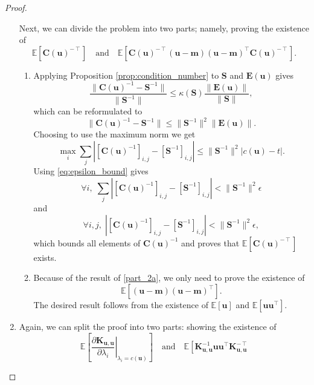 \documentclass{article}
\theoremstyle{definition}
\newcommand{\Kuu}{\mathbf{K}_{\mathbf{u},\mathbf{u}}}
\begin{document}
\begin{proof}
\begin{enumerate}
    Next, we can divide the problem into two parts; namely, proving the
    existence of
    \[ \mathbb{E}[\mathbf{C}(\mathbf{u})^{-\intercal}] \quad \text{and} \quad
      \mathbb{E}[\mathbf{C}(\mathbf{u})^{-\intercal}(\mathbf{u} -
      \mathbf{m})(\mathbf{u} -
      \mathbf{m})^\intercal\mathbf{C}(\mathbf{u})^{-\intercal}]. \]
    \begin{enumerate}
    \item \label{part_2a} Applying Proposition \ref{prop:condition_number} to
      $\mathbf{S}$ and $\mathbf{E}(\mathbf{u})$ gives
      \[
        \frac{\lVert \mathbf{C}(\mathbf{u})^{-1} - \mathbf{S}^{-1}
          \rVert}{\lVert \mathbf{S}^{-1} \rVert} \le
        \kappa(\mathbf{S})\frac{\lVert \mathbf{E}(\mathbf{u}) \rVert}{\lVert
          \mathbf{S} \rVert},
      \] %
      which can be reformulated to
      \[ \lVert \mathbf{C}(\mathbf{u})^{-1} - \mathbf{S}^{-1} \rVert \le \lVert
        \mathbf{S}^{-1} \rVert^2 \lVert \mathbf{E}(\mathbf{u}) \rVert. \]
      Choosing to use the maximum norm we get
      \[
        \max_i \sum_j |[\mathbf{C}(\mathbf{u})^{-1}]_{i,j} -
        [\mathbf{S}^{-1}]_{i,j}| \le \lVert \mathbf{S}^{-1} \rVert^2
        |c(\mathbf{u}) - t|.
      \]
      Using \eqref{eq:epsilon_bound} gives
      \[
        \forall i,\; \sum_j |[\mathbf{C}(\mathbf{u})^{-1}]_{i,j} -
        [\mathbf{S}^{-1}]_{i,j}| < \lVert \mathbf{S}^{-1} \rVert^2\epsilon
      \]
      and
      \[
        \forall i, j, \; |[\mathbf{C}(\mathbf{u})^{-1}]_{i,j} -
        [\mathbf{S}^{-1}]_{i,j}| < \lVert \mathbf{S}^{-1} \rVert^2\epsilon,
      \]
      which bounds all elements of $\mathbf{C}(\mathbf{u})^{-1}$ and proves that
      $\mathbb{E}[\mathbf{C}(\mathbf{u})^{-\intercal}]$ exists.
    \item Because of the result of \ref{part_2a}, we only need to prove the
      existence of
      \[
        \mathbb{E}[(\mathbf{u} - \mathbf{m})(\mathbf{u} -
        \mathbf{m})^\intercal].
      \]
      The desired result follows from the existence of $\mathbb{E}[\mathbf{u}]$
      and $\mathbb{E}[\mathbf{u}\mathbf{u}^\intercal]$.
    \end{enumerate}
  \item Again, we can split the proof into two parts: showing the existence of
    \[
      \mathbb{E} \left[ \left. \frac{\partial \Kuu}{\partial \lambda_i}
        \right|_{\lambda_i = c(\mathbf{u})} \right] \quad \text{and} \quad
      \mathbb{E} \left[ \Kuu^{-1}\mathbf{u}\mathbf{u}^\intercal\Kuu^{-\intercal}
\]
\end{enumerate}
\end{proof}
\end{document}

